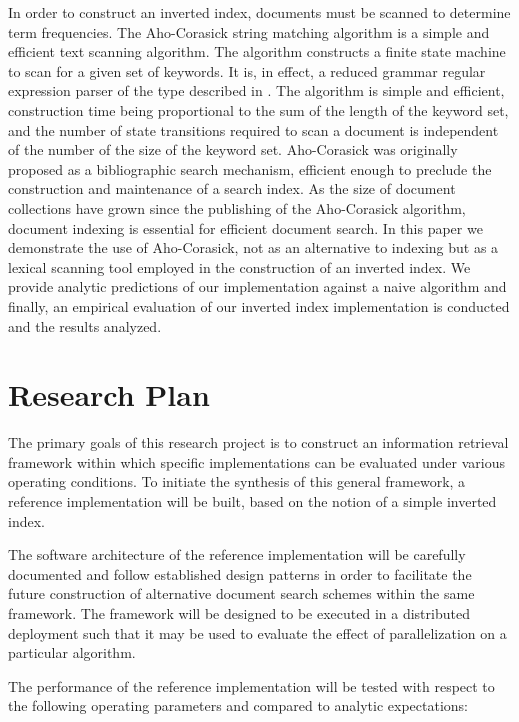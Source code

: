\documentclass[10pt]{article}
\begin{document}
In order to construct an inverted index, documents must be scanned to
determine term frequencies. The Aho-Corasick string matching
algorithm\cite{RefWorks:103} is a simple and efficient text scanning algorithm. The
algorithm constructs a finite state machine to scan for a given set of
keywords. It is, in effect, a reduced grammar regular expression
parser of the type described in \cite{RefWorks:111}. The algorithm is simple and
efficient, construction time being proportional to the sum of the
length of the keyword set, and the number of state transitions
required to scan a document is independent of the number of the size
of the keyword set. Aho-Corasick was originally proposed as a
bibliographic search mechanism, efficient enough to preclude the
construction and maintenance of a search index. As the size of
document collections have grown since the publishing of the
Aho-Corasick algorithm, document indexing is essential for efficient
document search. In this paper we demonstrate the use of Aho-Corasick,
not as an alternative to indexing but as a lexical scanning tool
employed in the construction of an inverted index. We provide analytic
predictions of our implementation against a naive algorithm and
finally, an empirical evaluation of our inverted index implementation
is conducted and the results analyzed.


\section{Research Plan}
\label{sec:researchplan}
The primary goals of this research project is to construct an
information retrieval framework within which specific implementations
can be evaluated under various operating conditions. To initiate the
synthesis of this general framework, a reference implementation will
be built, based on the notion of a simple inverted index.

The software architecture of the reference implementation will be
carefully documented and follow established design patterns in order
to facilitate the future construction of alternative document search
schemes within the same framework. The framework will be designed to
be executed in a distributed deployment such that it may be used to
evaluate the effect of parallelization on a particular algorithm.

The performance of the reference implementation will be tested with
respect to the following operating parameters and compared to analytic
expectations:
\end{document}

